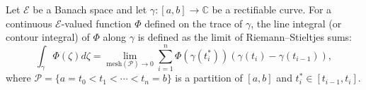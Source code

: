 Let $\mathcal{E}$ be a Banach space and let $\gamma: [a, b] \to \mathbb{C}$ be a rectifiable curve. For a continuous $\mathcal{E}$-valued function $\Phi$ defined on the trace of $\gamma$, the line integral (or contour integral) of $\Phi$ along $\gamma$ is defined as the limit of Riemann--Stieltjes sums:
$$\int_{\gamma} \Phi(\zeta) d\zeta = \lim_{\text{mesh}(\mathcal{P}) \to 0} \sum_{i=1}^{n} \Phi(\gamma(t_i^*)) (\gamma(t_i) - \gamma(t_{i-1})),$$
where $\mathcal{P} = \{a = t_0 < t_1 < \cdots < t_n = b\}$ is a partition of $[a, b]$ and $t_i^* \in [t_{i-1}, t_i]$.
